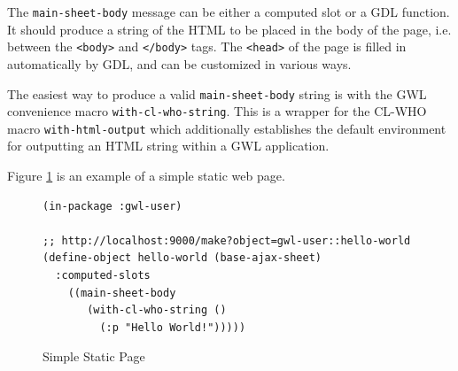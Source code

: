 \documentclass [11pt]{book}
\begin{document}
The \texttt{main-sheet-body} message can be either a computed slot or a GDL function.  It should
produce a string of the HTML to be placed in the body of the page, i.e. between the \texttt{<body>} and
\texttt{</body>} tags.  The \texttt{<head>} of the page is filled in automatically by GDL, and can be
customized in various ways.



The easiest way to produce a valid \texttt{main-sheet-body} string is with the GWL convenience macro
\texttt{with-cl-who-string}.  This is a wrapper for the CL-WHO macro \texttt{with-html-output} which
additionally establishes the default environment for outputting an HTML string within a GWL application.



Figure 
\ref{fig:gwl-hello-world} is an example of a simple static web page.
\begin{figure}
\begin{lrbox}{\boxedverb}
\begin{minipage}{\linewidth}
{\small

\begin{verbatim}(in-package :gwl-user)

;; http://localhost:9000/make?object=gwl-user::hello-world
(define-object hello-world (base-ajax-sheet)
  :computed-slots
    ((main-sheet-body
       (with-cl-who-string ()
         (:p "Hello World!")))))

\end{verbatim}}
\end{minipage}
\end{lrbox}
\fbox{\usebox{\boxedverb}}

\caption{Simple Static Page}

\label{fig:gwl-hello-world}

\end{figure}
\end{document}
